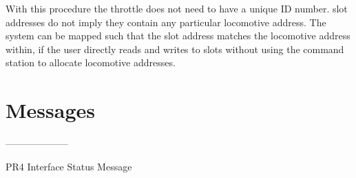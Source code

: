 With this procedure the throttle does not need to have a unique ID number. slot addresses do not imply they contain any particular locomotive address. The system can be mapped such that the slot address matches the locomotive address within, if the user directly reads and writes to slots without using the command station to allocate locomotive addresses.

\section{Messages}











































--------------------

PR4 Interface Status Message

